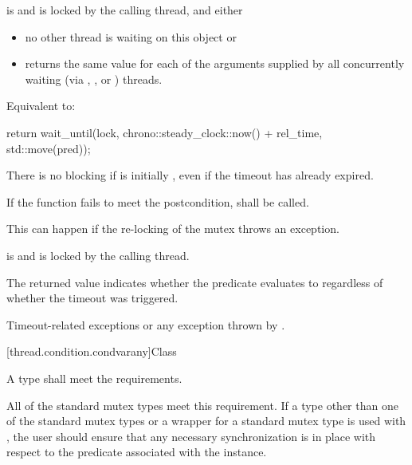 \begin{itemdescr}
\pnum
\requires {} is  and 
is locked by the calling thread, and either
\begin{itemize}
\item
no other thread is waiting on this  object or

\item
{} returns the same value for each of the  arguments
supplied by all concurrently waiting (via , , or
) threads.
\end{itemize}

\pnum
\effects
Equivalent to:
\begin{codeblock}
return wait_until(lock, chrono::steady_clock::now() + rel_time, std::move(pred));
\end{codeblock}

\pnum
\begin{note}
There is no blocking if  is initially , even if the
timeout has already expired.
\end{note}

\pnum
\remarks
If the function fails to meet the postcondition, 
shall be called.
\begin{note}
This can happen if the re-locking of the mutex throws an exception.
\end{note}

\pnum
\ensures
{} is  and 
is locked by the calling thread.

\pnum
\begin{note}
The returned value indicates whether the predicate evaluates to 
regardless of whether the timeout was triggered.
\end{note}

\pnum
\throws
Timeout-related
exceptions or any exception thrown by .

\end{itemdescr}

[thread.condition.condvarany]{Class }

\pnum
A  type shall meet the 
requirements.
\begin{note}
All of the standard
mutex types meet this requirement. If a  type other than one of the
standard mutex types or a  wrapper for a standard mutex type
is used with , the user should ensure that any
necessary synchronization is in place with respect to the predicate associated
with the  instance.
\end{note}

